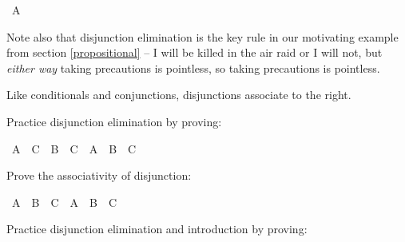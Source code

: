 \begin{isabellebody}
\ {\isachardoublequoteopen}A{\isachardoublequoteclose}\isacommand{{\isachardot}}\isamarkupfalse%
\isanewline
\ \ \isamarkupfalse%
\isanewline
{}\isamarkupfalse%
%
\endisatagproof
{\isafoldproof}%
%
\isadelimproof
%
\endisadelimproof
%
\begin{isamarkuptext}%
Note also that disjunction elimination is the key rule in our motivating example from
section \ref{propositional} -- I will be killed in the air raid or I will not, but \emph{either way}
taking precautions is pointless, so taking precautions is pointless.%
\end{isamarkuptext}\isamarkuptrue%
%
\begin{isamarkuptext}%
Like conditionals and conjunctions, disjunctions associate to the right.%
\end{isamarkuptext}\isamarkuptrue%
%
\begin{isamarkuptext}%
\begin{Exercise} Practice disjunction elimination by proving: \end{Exercise}%
\end{isamarkuptext}\isamarkuptrue%
\isamarkupfalse%
\ {\isachardoublequoteopen}{\isacharparenleft}A\ {\isasymlongrightarrow}\ C{\isacharparenright}\ {\isasymand}\ {\isacharparenleft}B\ {\isasymlongrightarrow}\ C{\isacharparenright}\ {\isasymlongrightarrow}\ A\ {\isasymor}\ B\ {\isasymlongrightarrow}\ C{\isachardoublequoteclose}%
\isadelimproof
\ %
\endisadelimproof
%
\isatagproof
{}\isamarkupfalse%
%
\endisatagproof
{\isafoldproof}%
%
\isadelimproof
%
\endisadelimproof
%
\begin{isamarkuptext}%
\begin{Exercise}[title = The Associativity of Disjunction] 
Prove the associativity of disjunction: \end{Exercise}%
\end{isamarkuptext}\isamarkuptrue%
\isamarkupfalse%
\ {\isachardoublequoteopen}A\ {\isasymor}\ B\ {\isasymor}\ C\ {\isasymlongleftrightarrow}\ {\isacharparenleft}A\ {\isasymor}\ B{\isacharparenright}\ {\isasymor}\ C{\isachardoublequoteclose}%
\isadelimproof
\ %
\endisadelimproof
%
\isatagproof
{}\isamarkupfalse%
%
\endisatagproof
{\isafoldproof}%
%
\isadelimproof
%
\endisadelimproof
%
\begin{isamarkuptext}%
\begin{Exercise}[label = disjEexercises] Practice disjunction elimination and introduction by proving: \end{Exercise}%

\end{isamarkuptext}
\end{isabellebody}
